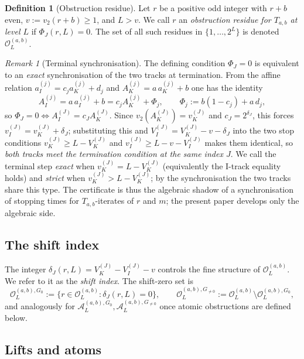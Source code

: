 \documentclass[11pt,reqno]{amsart}
\theoremstyle{plain}
\theoremstyle{definition}
\newtheorem{definition}[theorem]{Definition}
\theoremstyle{remark}
\newtheorem{remark}[theorem]{Remark}
\newcommand{\Tab}{T_{a,b}}
\newcommand{\Obs}{\mathcal{O}}
\newcommand{\Atom}{\mathcal{A}}
\newcommand{\Vk}{V_{K}}
\newcommand{\Vi}{V_{I}}
\newcommand{\vk}{v_{K}}
\newcommand{\vi}{v_{I}}
\newcommand{\vtwo}{v_{2}}
\newcommand{\Obsab}{\Obs_{L}^{(a,b)}}
\begin{document}
\begin{definition}[Obstruction residue]\label{def:obstruction}
Let $r$ be a positive odd integer with $r + b$ even, $v := \vtwo(r+b) \ge 1$,
and $L > v$. We call $r$ an \emph{obstruction residue for $\Tab$ at
level $L$} if $\Phi_J(r, L) = 0$. The set of all such residues in
$\{1, \ldots, 2^L\}$ is denoted $\Obsab$.
\end{definition}

\begin{remark}[Terminal synchronisation]\label{rem:sync}
The defining condition $\Phi_J = 0$ is equivalent to an \emph{exact}
synchronisation of the two tracks at termination. From the affine relation
$a_I^{(j)} = c_j a_K^{(j)} + d_j$ and $A_K^{(j)} = a\,a_K^{(j)} + b$ one has
the identity
\[
A_I^{(j)} = a\,a_I^{(j)} + b = c_j A_K^{(j)} + \Phi_j, \qquad
\Phi_j := b(1 - c_j) + a\,d_j,
\]
so $\Phi_J = 0 \iff A_I^{(J)} = c_J A_K^{(J)}$. Since
$\vtwo(A_K^{(J)}) = \vk^{(J)}$ and $c_J = 2^{\delta_J}$, this forces
$\vi^{(J)} = \vk^{(J)} + \delta_J$; substituting this and
$\Vi^{(J)} = \Vk^{(J)} - v - \delta_J$ into the two stop conditions
$\vk^{(J)} \ge L - \Vk^{(J)}$ and $\vi^{(J)} \ge L - v - \Vi^{(J)}$ makes
them identical, so \emph{both tracks meet the termination condition at the
same index $J$}. We call the terminal step \emph{exact} when
$\vk^{(J)} = L - \Vk^{(J)}$ (equivalently the I-track equality holds) and
\emph{strict} when $\vk^{(J)} > L - \Vk^{(J)}$; by the synchronisation the
two tracks share this type. The certificate is thus the algebraic shadow
of a synchronisation of stopping times for $\Tab$-iterates of $r$ and $m$;
the present paper develops only the algebraic side.
\end{remark}

\subsection{The shift index}

The integer $\delta_J(r, L) = \Vk^{(J)} - \Vi^{(J)} - v$ controls the
fine structure of $\Obsab$. We refer to it as the \emph{shift index}.
The shift-zero set is
\[
\Obs_L^{(a,b), G_0} := \{r \in \Obsab : \delta_J(r,L) = 0\},
\qquad
\Obs_L^{(a,b), G_{\ne 0}} := \Obsab \setminus \Obs_L^{(a,b), G_0},
\]
and analogously for $\Atom_L^{(a,b), G_0}, \Atom_L^{(a,b), G_{\ne 0}}$
once atomic obstructions are defined below.

\subsection{Lifts and atoms}\label{ssec:lifts}
\end{document}

